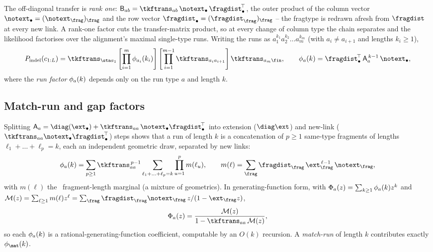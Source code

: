 The off-diagonal transfer is \emph{rank one}:
$\transbetween_{ab}=\tkftrans_{ab}\,\notext_\bullet\,\fragdist_\bullet^{\!\top}$,
the outer product of the column vector $\notext_\bullet=(\notext_\frag)_\frag$ and
the row vector $\fragdist_\bullet=(\fragdist_\frag)_\frag$ -- the fragtype is
redrawn afresh from $\fragdist$ at every new link.
A rank-one factor cuts the transfer-matrix product, so at every change of column
type the chain separates and the likelihood factorises over the alignment's
maximal single-type runs.
Writing the runs as $a_1^{k_1}a_2^{k_2}\ldots a_m^{k_m}$ (with $a_i\neq a_{i+1}$
and lengths $k_i\geq1$),
\begin{equation}\label{eq:mixfrag-runfactor}
P_{\mathrm{indel}}(c_{1:L}) =
\tkftrans_{\sta a_1}
\left[\prod_{i=1}^m \runfac_{a_i}(k_i)\right]
\left[\prod_{i=1}^{m-1}\tkftrans_{a_i a_{i+1}}\right]
\tkftrans_{a_m\fin},
\qquad
\runfac_a(k) = \fragdist_\bullet^{\!\top}\,\transwithin_a^{\,k-1}\,\notext_\bullet,
\end{equation}
where the \emph{run factor} $\phi_a(k)$ depends only on the run type $a$ and
length $k$.

\subsection{Match-run and gap factors}
\label{sec:mixfrag-factors}

Splitting $\transwithin_a=\diag(\ext_\bullet)+\tkftrans_{aa}\,\notext_\bullet\fragdist_\bullet^{\!\top}$
into extension ($\diag\ext$) and new-link ($\tkftrans_{aa}\notext_\bullet\fragdist_\bullet^{\!\top}$)
steps shows that a run of length $k$ is a concatenation of $p\geq1$ same-type
fragments of lengths $\ell_1+\ldots+\ell_p=k$, each an independent geometric draw,
separated by new links:
\begin{equation}\label{eq:mixfrag-mell}
\runfac_a(k)
= \sum_{p\geq1}\tkftrans_{aa}^{\,p-1}
\sum_{\ell_1+\ldots+\ell_p=k}\prod_{u=1}^p m(\ell_u),
\qquad
m(\ell)=\sum_\frag\fragdist_\frag\,\ext_\frag^{\,\ell-1}\,\notext_\frag,
\end{equation}
with $m(\ell)$ the \mixfrag\ fragment-length marginal (a mixture of geometrics).
In generating-function form, with $\Phi_a(z)=\sum_{k\geq1}\phi_a(k)z^k$ and
$\mathcal{M}(z)=\sum_{\ell\geq1}m(\ell)z^\ell
=\sum_\frag\fragdist_\frag\notext_\frag\,z/(1-\ext_\frag z)$,
\begin{equation}\label{eq:mixfrag-gf}
\Phi_a(z)=\frac{\mathcal{M}(z)}{1-\tkftrans_{aa}\,\mathcal{M}(z)},
\end{equation}
so each $\phi_a(k)$ is a rational-generating-function coefficient, computable by
an $O(k)$ recursion.
A \emph{match-run} of length $k$ contributes exactly $\runfac_\mat(k)$.

